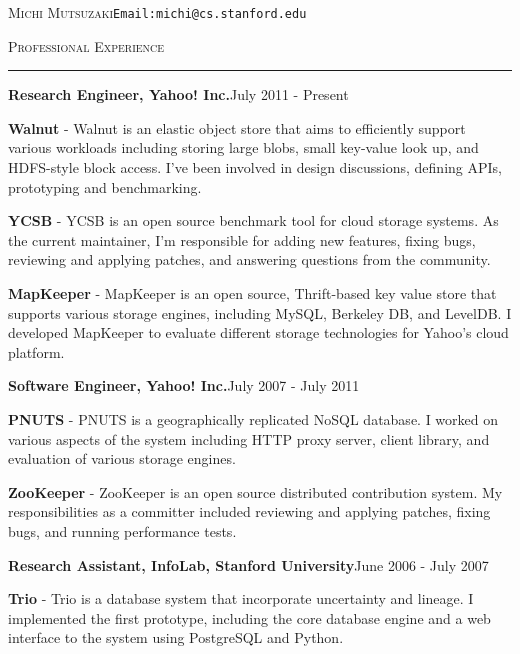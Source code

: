 \documentclass[10pt]{article}
\newcommand{\name}[1]{\begin{center}\Large{\textsc{#1}}\end{center}}
\newcommand{\HRule}{\noindent\rule{\linewidth}{0.1mm}}
\newcommand{\header}[1]{\vspace{0.4cm}\noindent\textsc{\large{#1}}\vspace{-0.2cm}\newline\HRule}
\newcommand{\subheader}[2]{\noindent \textbf{#1}\hspace{\stretch{1}}#2}
\renewcommand{\name}[2]{\noindent \textsc{\LARGE{#1}}\hspace{\stretch{1}}#2\vspace{-0.2cm}}
\begin{document}
\name{Michi Mutsuzaki}{\texttt{Email:michi@cs.stanford.edu}}

\header{Professional Experience}

\subheader{Research Engineer, Yahoo! Inc.}{July 2011 - Present}
\begin{list}{}{\leftmargin=1em}
\item \textbf{Walnut} - Walnut is an elastic object store that aims to efficiently
support various workloads including storing large blobs, small key-value look up,
and HDFS-style block access. I've been involved in design discussions, defining APIs,
prototyping and benchmarking. 

\item \textbf{YCSB} - YCSB is an open source benchmark tool for cloud storage
systems. As the current maintainer, I'm responsible for adding new features, 
fixing bugs, reviewing and applying patches, and answering questions from the 
community.

\item \textbf{MapKeeper} - MapKeeper is an open source, Thrift-based key value
store that supports various storage engines, including MySQL, Berkeley DB, and 
LevelDB. I developed MapKeeper to evaluate different storage technologies for
Yahoo's cloud platform.
\end{list}
\vspace{0.2cm}

\subheader{Software Engineer, Yahoo! Inc.}{July 2007 - July 2011}
\begin{list}{}{\leftmargin=1em}
\item \textbf{PNUTS} - PNUTS is a geographically replicated NoSQL database. I
worked on various aspects of the system including HTTP proxy server, client
library, and evaluation of various storage engines.

\item \textbf{ZooKeeper} - ZooKeeper is an open source distributed contribution
system. My responsibilities as a committer included reviewing and applying patches,
fixing bugs, and running performance tests.
\end{list}

\vspace{0.2cm}

\subheader{Research Assistant, InfoLab, Stanford University}{June 2006 - July 2007}

\noindent
\begin{list}{}{\leftmargin=1em}
\item \textbf{Trio} - Trio is a database system that incorporate uncertainty
and lineage. I implemented the first prototype, including the core database
engine and a web interface to the system using PostgreSQL and Python.
\end{list}
\end{document}

